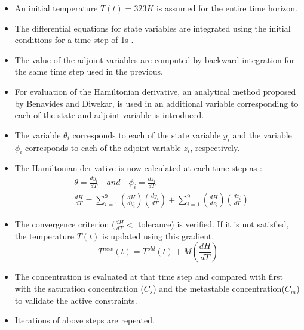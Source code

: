 \documentclass[3p,times]{elsarticle}
\begin{document}
\begin{itemize}
\item An initial temperature $T(t) = 323 K$ is assumed for the entire time horizon.
\item The differential equations for state variables are integrated using the initial conditions for a time step of 1s .
\item The value of the adjoint variables are computed by backward integration for the same time step used in the previous.
\item For evaluation of the Hamiltonian derivative, an analytical method proposed by Benavides and Diwekar\cite{benavides},  is used in an additional variable corresponding to each of the state and adjoint variable is introduced.
\item The variable $\theta_{i}$ corresponds to each of the state variable $y_{i}$ and the variable $\phi_{i}$ corresponds to each of the adjoint variable $z_{i}$, respectively.
\item The Hamiltonian derivative is now calculated at each time step  as :
\begin{align}
&\theta = \frac{dy_{i}}{dT} \quad and \quad \phi_{i} = \frac{dz_{i}}{dT} \\
&\frac{dH}{dT} = \sum_{i=1}^{9} \left( \frac{dH}{dy_{i}}\right)\left(	\frac{dy_{i}}{dT} \right) + \sum_{i=1}^{9} \left(\frac{dH}{dz_{i}}\right)\left(\frac{dz_{i}}{dT} \right)
\end{align}
\item The  convergence criterion $(\frac{dH}{dT}<$ tolerance) is verified. If it is not satisfied, the temperature $T(t)$ is updated using this gradient\cite{yenkie}.
\begin{equation}
T^{new}(t) = T^{old}(t) + M\left(\frac{dH}{dT} \right)
\end{equation}
\item The concentration is evaluated  at that time step and compared with first with the saturation concentration ($C_{s}$) and the metastable concentration($C_{m}$) to validate the active constraints.
\item Iterations of above steps are repeated.
\end{itemize}


\end{document}
